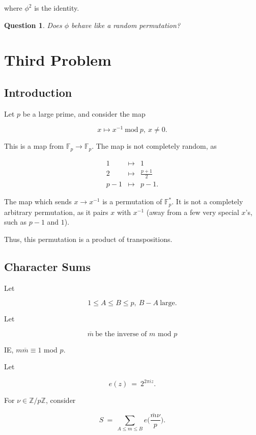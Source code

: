 \documentclass[12pt,letterpaper]{report}
\newcommand\be{\begin{equation}}
\newcommand\ee{\end{equation}}
\newcommand\bea{\begin{eqnarray}}
\newcommand\eea{\end{eqnarray}}
\newcommand{\Z}{\ensuremath{\mathbb{Z}}}
\newcommand{\F}{\mathbb{F}}
\newcommand{\Fp}{ \F_p }
\newcommand{\Fpf}{ \Fp^{*} }
\newtheorem{que}[thm]{Question}
\begin{document}
where $\phi^2$ is the identity.

\begin{que} Does $\phi$ behave like a random permutation?
\end{que}





\section{Third Problem}

\subsection{Introduction}

Let $p$ be a large prime, and consider the map

\be x \mapsto x^{-1} \ \text{mod} \ p, \ x \neq 0. \ee

This is a map from $\Fp \to \Fp$. The map is not completely
random, as

\bea 1 & \mapsto & 1 \nonumber\\ 2 & \mapsto & \frac{p+1}{2}
\nonumber\\ p-1 & \mapsto & p-1. \eea

The map which sends $x \to x^{-1}$ is a permutation of $\Fpf$. It
is not a completely arbitrary permutation, as it pairs $x$ with
$x^{-1}$ (away from a few very special $x$'s, such as $p-1$ and
$1$).

Thus, this permutation is a product of transpositions.


\subsection{Character Sums}

Let

\be 1 \le A \le B \le p, \ B - A \ \text{large}. \ee

Let

\be \overline{m} \ \text{be the inverse of $m$ mod $p$} \ee

IE, $m \overline{m} \equiv 1$ mod $p$.

Let

\be e(z) \ = \ 2^{2\pi i z}. \ee

For $\nu \in \Z/p\Z$, consider

\be S \ = \ \sum_{A \le m \le B} e\Big( \frac{\overline{m}\nu}{p}
\Big). \ee
\end{document}
